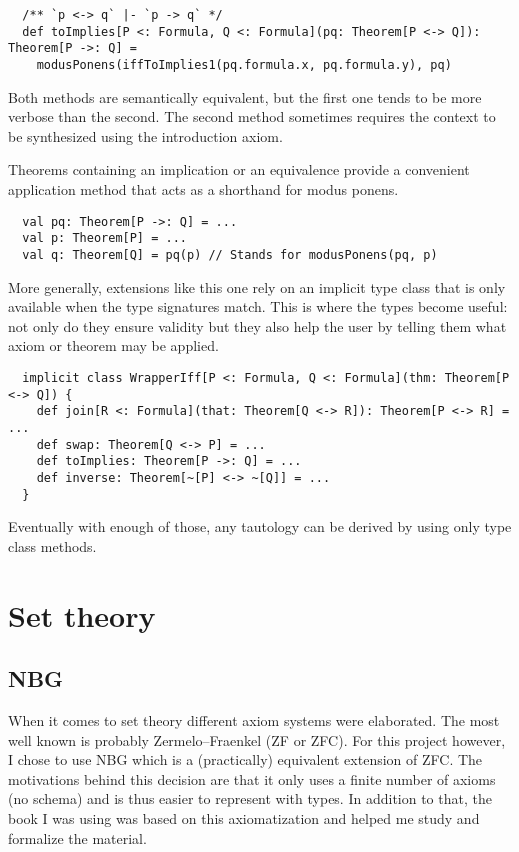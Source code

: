\documentclass[acmlarge]{acmart}
\begin{document}
\begin{verbatim}
  /** `p <-> q` |- `p -> q` */
  def toImplies[P <: Formula, Q <: Formula](pq: Theorem[P <-> Q]): Theorem[P ->: Q] =
    modusPonens(iffToImplies1(pq.formula.x, pq.formula.y), pq)
\end{verbatim}

Both methods are semantically equivalent, but the first one tends to be more verbose than the second. The second method sometimes requires the context to be synthesized using the introduction axiom.

Theorems containing an implication or an equivalence provide a convenient application method that acts as a shorthand for modus ponens.

\begin{verbatim}
  val pq: Theorem[P ->: Q] = ...
  val p: Theorem[P] = ...
  val q: Theorem[Q] = pq(p) // Stands for modusPonens(pq, p)
\end{verbatim}

More generally, extensions like this one rely on an implicit type class that is only available when the type signatures match. This is where the types become useful: not only do they ensure validity but they also help the user by telling them what axiom or theorem may be applied.

\begin{verbatim}
  implicit class WrapperIff[P <: Formula, Q <: Formula](thm: Theorem[P <-> Q]) {
    def join[R <: Formula](that: Theorem[Q <-> R]): Theorem[P <-> R] = ...
    def swap: Theorem[Q <-> P] = ...
    def toImplies: Theorem[P ->: Q] = ...
    def inverse: Theorem[~[P] <-> ~[Q]] = ...
  }
\end{verbatim}

Eventually with enough of those, any tautology can be derived by using only type class methods.

\section{Set theory}

\subsection{NBG}

When it comes to set theory different axiom systems were elaborated. The most well known is probably Zermelo–Fraenkel (ZF or ZFC). For this project however, I chose to use NBG which is a (practically) equivalent extension of ZFC. The motivations behind this decision are that it only uses a finite number of axioms (no schema) and is thus easier to represent with types. In addition to that, the book I was using \cite{Mendelson} was based on this axiomatization and helped me study and formalize the material.
\end{document}
